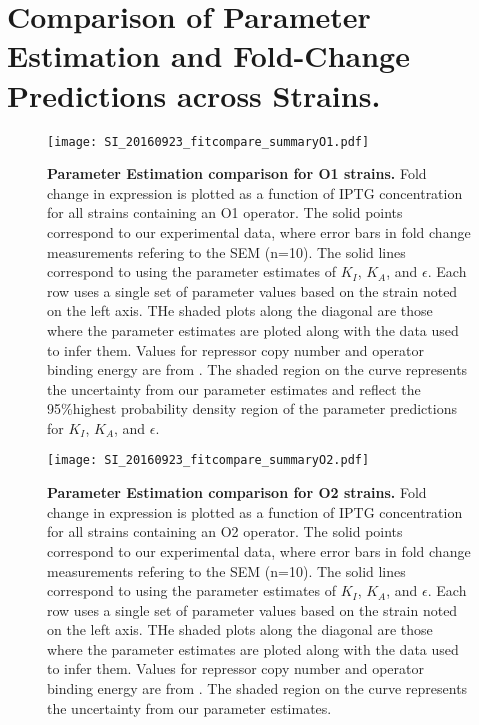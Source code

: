 \section{Comparison of Parameter Estimation and Fold-Change Predictions across Strains.} \label{AppendixParamEstimation}

\begin{figure}[h]
	\centering \texttt{[image: SI\_20160923\_fitcompare\_summaryO1.pdf]}
	\caption{{\bf Parameter Estimation comparison for O1 strains.} Fold change in expression is plotted as a function of IPTG concentration for all strains containing an O1 operator. The solid points correspond to our experimental data, where error bars in fold change measurements refering to the SEM (n=10). The solid lines correspond to \eref[eq7] using the parameter estimates of $K_I$, $K_A$, and $\epsilon$. Each row uses a single set of parameter values based on the strain noted on the left axis. THe shaded plots along the diagonal are those where the parameter estimates are ploted along with the data used to infer them. Values for repressor copy number and operator binding energy are from \cite{Garcia2011}.  The shaded region on the curve represents the uncertainty from our parameter estimates and reflect the 95\%highest probability density region of the parameter predictions for $K_I$, $K_A$, and $\epsilon$.}
	\label{SIfig7}
\end{figure}

\begin{figure}[h]
	\centering \texttt{[image: SI\_20160923\_fitcompare\_summaryO2.pdf]}
	\caption{{\bf Parameter Estimation comparison for O2 strains.} Fold change in expression is plotted as a function of IPTG concentration for all strains containing an O2 operator. The solid points correspond to our experimental data, where error bars in fold change measurements refering to the SEM (n=10). The solid lines correspond to \eref[eq7] using the parameter estimates of $K_I$, $K_A$, and $\epsilon$. Each row uses a single set of parameter values based on the strain noted on the left axis. THe shaded plots along the diagonal are those where the parameter estimates are ploted along with the data used to infer them. Values for repressor copy number and operator binding energy are from \cite{Garcia2011}.  The shaded region on the curve represents the uncertainty from our parameter estimates.}
	\label{SIfig8}
\end{figure}

